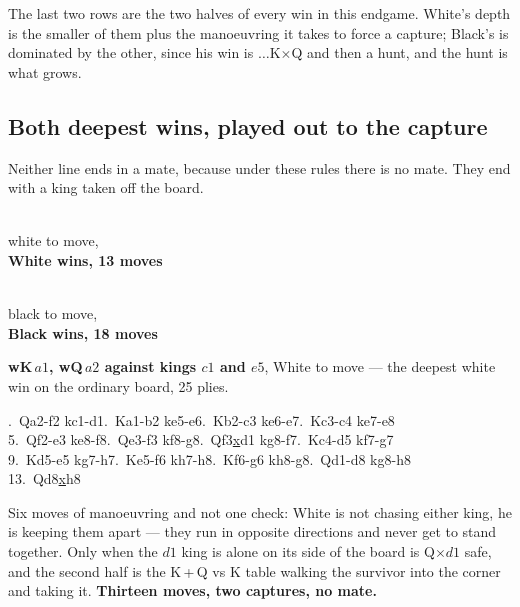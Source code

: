 \documentclass[11pt]{article}
\begin{document}
\noindent
The last two rows are the two halves of every win in this endgame. White's
depth is the smaller of them plus the manoeuvring it takes to force a capture;
Black's is dominated by the other, since his win is $\ldots$K$\times$Q and then
a hunt, and the hunt is what grows.

\subsection{Both deepest wins, played out to the capture}\label{sub:cap-deepest}

Neither line ends in a mate, because under these rules there is no mate. They
end with a king taken off the board.

\begin{center}
\begin{minipage}{0.3\textwidth}\centering
  \\[1.2mm]
  {\small\color{kqkk}white to move,\\\textbf{White wins, 13 moves}}
\end{minipage}\hspace{0.06\textwidth}
\begin{minipage}{0.3\textwidth}\centering
  \\[1.2mm]
  {\small\color{kqkk}black to move,\\\textbf{Black wins, 18 moves}}
\end{minipage}
\end{center}

\noindent\textbf{wK\,$a1$, wQ\,$a2$ against kings $c1$ and $e5$}, White to
move --- the deepest white win on the ordinary board, 25 plies.

{\small{}.~Qa2-f2 kc1-d1.~Ka1-b2 ke5-e6.~Kb2-c3 ke6-e7.~Kc3-c4 ke7-e8\\
5.~Qf2-e3 ke8-f8.~Qe3-f3 kf8-g8.~Qf3\underline{x}d1 kg8-f7.~Kc4-d5 kf7-g7\\
9.~Kd5-e5 kg7-h7.~Ke5-f6 kh7-h8.~Kf6-g6 kh8-g8.~Qd1-d8 kg8-h8\\
13.~Qd8\underline{x}h8
}

\smallskip
\noindent
Six moves of manoeuvring and not one check: White is not chasing either king,
he is keeping them apart --- they run in opposite directions and never get to
stand together. Only when the $d1$ king is alone on its side of the board is
Q$\times d1$ safe, and the second half is the K\,+\,Q vs K table walking the
survivor into the corner and taking it. \textbf{Thirteen moves, two captures,
no mate.}
\end{document}
